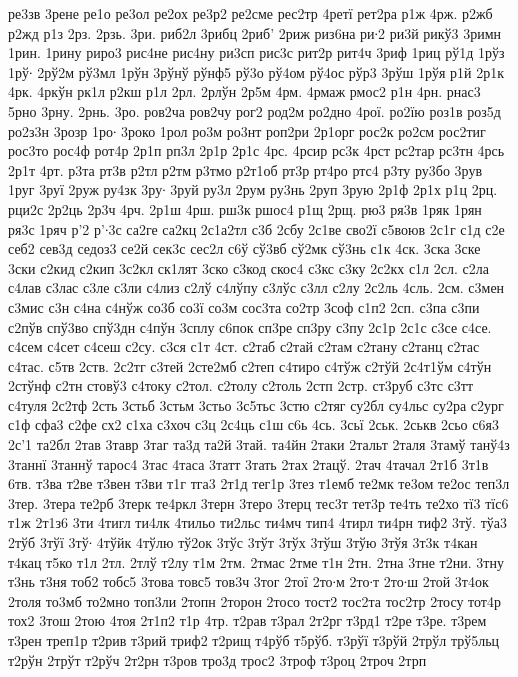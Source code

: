 {ре3зв
3рене
ре1о
ре3ол
ре2ох
ре3р2
ре2сме
рес2тр
4ретї
рет2ра
р1ж
4рж.
р2жб
р2жд
р1з
2рз.
2рзь.
3ри.
риб2л
3рибц
2риб'
2риж
риз6на
ри∙2
ри3й
рикў3
3римн
1рин.
1рину
риро3
рис4не
рис4ну
ри3сп
рис3с
рит2р
рит4ч
3риф
1риц
рў1д
1рўз
1рў∙
2рў2м
рў3мл
1рўн
3рўнў
рўнф5
рў3о
рў4ом
рў4ос
рўр3
3рўш
1рўя
р1й
2р1к
4рк.
4ркўн
рк1л
р2кш
р1л
2рл.
2рлўн
2р5м
4рм.
4рмаж
рмос2
р1н
4рн.
рнас3
5рно
3рну.
2рнь.
3ро.
ров2ча
ров2чу
рог2
род2м
ро2дно
4рої.
ро2їю
роз1в
роз5д
ро2з3н
3розр
1ро∙
3роко
1рол
ро3м
ро3нт
роп2ри
2р1орг
рос2к
ро2см
рос2тиг
рос3то
рос4ф
рот4р
2р1п
рп3л
2р1р
2р1с
4рс.
4рсир
рс3к
4рст
рс2тар
рс3тн
4рсь
2р1т
4рт.
р3та
рт3в
р2тл
р2тм
р3тмо
р2т1об
рт3р
рт4ро
ртс4
р3ту
ру3бо
3рув
1руг
3руї
2руж
ру4зк
3ру∙
3руй
ру3л
2рум
ру3нь
2руп
3рую
2р1ф
2р1х
р1ц
2рц.
рци2с
2р2ць
2р3ч
4рч.
2р1ш
4рш.
рш3к
ршос4
р1щ
2рщ.
рю3
ря3в
1ряк
1рян
ря3с
1ряч
р'2
р'∙3с
са2ге
са2кц
2с1а2тл
с3б
2сбу
2с1ве
сво2ї
с5воюв
2с1г
с1д
с2е
себ2
сев3д
седоз3
се2й
сек3с
сес2л
с6ў
сў3вб
сў2мк
сў3нь
с1к
4ск.
3ска
3ске
3ски
с2кид
с2кип
3с2кл
ск1лят
3ско
с3код
скос4
с3кс
с3ку
2с2кх
с1л
2сл.
с2ла
с4лав
с3лас
с3ле
с3ли
с4лиз
с2лў
с4лўпу
с3лўс
с3лл
с2лу
2с2ль
4сль.
2см.
с3мен
с3мис
с3н
с4на
с4нўж
со3б
со3ї
со3м
сос3та
со2тр
3соф
с1п2
2сп.
с3па
с3пи
с2пўв
спў3во
спў3дн
с4пўн
3сплу
с6пок
сп3ре
сп3ру
с3пу
2с1р
2с1с
с3се
с4се.
с4сем
с4сет
с4сеш
с2су.
с3ся
с1т
4ст.
с2таб
с2тай
с2там
с2тану
с2танц
с2тас
с4тас.
с5тв
2ств.
2с2тг
с3тей
2сте2мб
с2теп
с4тиро
с4тўж
с2тўй
2с4т1ўм
с4тўн
2стўнф
с2тн
стовў3
с4току
с2тол.
с2толу
с2толь
2стп
2стр.
ст3руб
с3тс
с3тт
с4туля
2с2тф
2сть
3стьб
3стьм
3стьо
3с5тьс
3стю
с2тяг
су2бл
су4льс
су2ра
с2ург
с1ф
сфа3
с2фе
сх2
с1ха
с3хоч
с3ц
2с4ць
с1ш
с6ь
4сь.
3сьї
2ськ.
2ськв
2сьо
с6я3
2с'1
та2бл
2тав
3тавр
3таг
та3д
та2й
3тай.
та4йн
2таки
2тальт
2таля
3тамў
танў4з
3таннї
3таннў
тарос4
3тас
4таса
3татт
3тать
2тах
2тацў.
2тач
4тачал
2т1б
3т1в
6тв.
т3ва
т2ве
т3вен
т3ви
т1г
тга3
2т1д
тег1р
3тез
т1емб
те2мк
те3ом
те2ос
теп3л
3тер.
3тера
те2рб
3терк
те4ркл
3терн
3теро
3терц
тес3т
тет3р
те4ть
те2хо
тї3
тїс6
т1ж
2т1з6
3ти
4тигл
ти4лк
4тильо
ти2льс
ти4мч
тип4
4тирл
ти4рн
тиф2
3тў.
тўа3
2тўб
3тўї
3тў∙
4тўйк
4тўлю
тў2ок
3тўс
3тўт
3тўх
3тўш
3тўю
3тўя
3т3к
т4кан
т4кац
т5ко
т1л
2тл.
2тлў
т2лу
т1м
2тм.
2тмас
2тме
т1н
2тн.
2тна
3тне
т2ни.
3тну
т3нь
т3ня
тоб2
тобс5
3това
товс5
тов3ч
3тог
2тої
2то∙м
2то∙т
2то∙ш
2той
3т4ок
2толя
то3мб
то2мно
топ3ли
2топн
2торон
2тосо
тост2
тос2та
тос2тр
2тосу
тот4р
тох2
3тош
2тою
4тоя
2т1п2
т1р
4тр.
т2рав
т3рал
2т2рг
т3рд1
т2ре
т3ре.
т3рем
т3рен
треп1р
т2рив
т3рий
триф2
т2рищ
т4рўб
т5рўб.
т3рўї
т3рўй
2трўл
трў5льц
т2рўн
2трўт
т2рўч
2т2рн
т3ров
тро3д
трос2
3троф
т3роц
2троч
2трп
}
